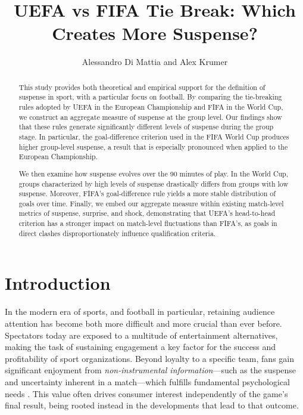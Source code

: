 \documentclass[11pt]{article}
\title{UEFA vs FIFA Tie Break: Which Creates More Suspense?}
\author{Alessandro Di Mattia and Alex Krumer}
\date{}   %
\begin{document}
\maketitle

\begin{abstract}
This study provides both theoretical and empirical support for the definition of suspense in sport, with a particular focus on football. By comparing the tie-breaking rules adopted by UEFA in the European Championship and FIFA in the World Cup, we construct an aggregate measure of suspense at the group level. Our findings show that these rules generate significantly different levels of suspense during the group stage. In particular, the goal-difference criterion used in the FIFA World Cup produces higher group-level suspense, a result that is especially pronounced when applied to the European Championship.

We then examine how suspense evolves over the 90 minutes of play. In the World Cup, groups characterized by high levels of suspense drastically differs from groups with low suspense. Moreover, FIFA's goal-difference rule yields a more stable distribution of goals over time. Finally, we embed our aggregate measure within existing match-level metrics of suspense, surprise, and shock, demonstrating that UEFA’s head-to-head criterion has a stronger impact on match-level fluctuations than FIFA’s, as goals in direct clashes disproportionately influence qualification criteria.
\end{abstract}


\newpage

\section{Introduction}

In the modern era of sports, and football in particular, retaining audience attention has become both more difficult and more crucial than ever before. Spectators today are exposed to a multitude of entertainment alternatives, making the task of sustaining engagement a key factor for the success and profitability of sport organizations. Beyond loyalty to a specific team, fans gain significant enjoyment from \emph{non-instrumental information}—such as the suspense and uncertainty inherent in a match—which fulfills fundamental psychological needs \citep{ely2015suspense, zillmann2013psychology}. This value often drives consumer interest independently of the game’s final result, being rooted instead in the developments that lead to that outcome. \citep{vorderer2004enjoyment}
\end{document}
